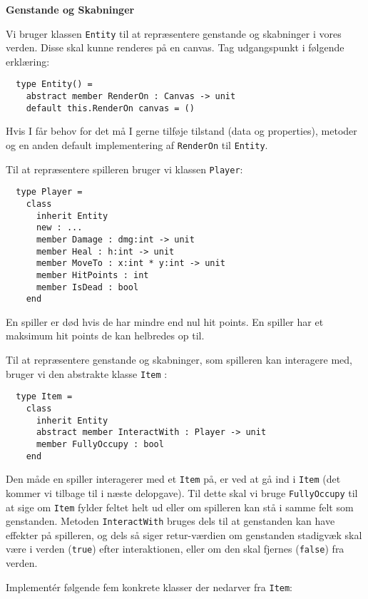 \textbf{Genstande og Skabninger}

Vi bruger klassen \lstinline{Entity} til at repræsentere genstande og skabninger
i vores verden. Disse skal kunne renderes på en canvas. Tag udgangspunkt i
følgende erklæring:

\begin{lstlisting}
  type Entity() =
    abstract member RenderOn : Canvas -> unit
    default this.RenderOn canvas = ()
\end{lstlisting}

Hvis I får behov for det må I gerne tilføje tilstand (data og
properties), metoder og en anden default implementering af
\lstinline{RenderOn} til \lstinline{Entity}.

Til at repræsentere spilleren bruger vi klassen \lstinline{Player}:

\begin{lstlisting}
  type Player =
    class
      inherit Entity
      new : ...
      member Damage : dmg:int -> unit
      member Heal : h:int -> unit
      member MoveTo : x:int * y:int -> unit
      member HitPoints : int
      member IsDead : bool
    end
\end{lstlisting}

En spiller er død hvis de har mindre end nul hit points. En spiller
har et maksimum hit points de kan helbredes op til.

Til at repræsentere genstande og skabninger, som spilleren kan
interagere med, bruger vi den abstrakte klasse \lstinline{Item}
:

\begin{lstlisting}
  type Item =
    class
      inherit Entity
      abstract member InteractWith : Player -> unit
      member FullyOccupy : bool
    end
\end{lstlisting}

Den måde en spiller interagerer med et \lstinline{Item} på, er ved at
gå ind i \lstinline{Item} (det kommer vi tilbage til i næste
delopgave). Til dette skal vi bruge \lstinline{FullyOccupy} til at
sige om \lstinline{Item} fylder feltet helt ud eller om spilleren kan
stå i samme felt som genstanden. Metoden \lstinline{InteractWith}
bruges dels til at genstanden kan have effekter på spilleren, og dels
så siger retur-værdien om genstanden stadigvæk skal være i verden
(\lstinline{true}) efter interaktionen, eller om den skal fjernes
(\lstinline{false}) fra verden.

Implementér følgende fem konkrete klasser der nedarver fra \lstinline{Item}:

